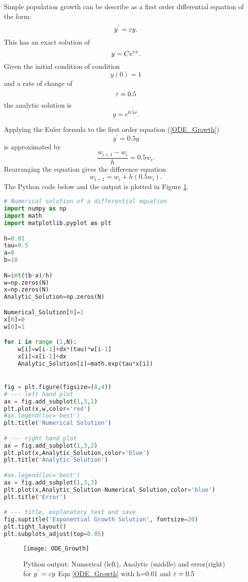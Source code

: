 \begin{example}
Simple population growth can be describe as a first order differential equation of the form: \begin{equation}\label{ODE_Growth} y^{'}=\varepsilon y. \end{equation}
This has an exact solution of 
\[ y=Ce^{\varepsilon x}. \]
Given the initial condition of  condition
\[y(0)=1\]
and a rate of change of
\[ \varepsilon=0.5\]
the analytic solution is
\[ y=e^{0.5x}.\]

\end{example}

\begin{example} Applying the Euler formula to the first order equation
(\ref{ODE_Growth})
\[ y^{'} = 0.5y \]
is approximated by
\[\frac{w_{i+1}-w_i}{h}=0.5w_i. \]
Rearranging the equation gives the difference equation
\[w_{i+1}=w_i+h(0.5w_i). \]
The Python code below and the output is plotted in Figure \ref{GROWTH ODE Figure}.

\begin{lstlisting}[language=Python, caption=Python Numerical and Analytical Solution of Eqn \ref{ODE_Growth} ]
# Numerical solution of a differential equation
import numpy as np
import math 
import matplotlib.pyplot as plt

h=0.01
tau=0.5
a=0
b=10

N=int((b-a)/h)
w=np.zeros(N)
x=np.zeros(N)
Analytic_Solution=np.zeros(N)

Numerical_Solution[0]=1
x[0]=0
w[0]=1

for i in range (1,N):
    w[i]=w[i-1]+dx*(tau)*w[i-1]
    x[i]=x[i-1]+dx
    Analytic_Solution[i]=math.exp(tau*x[i])


fig = plt.figure(figsize=(8,4))
# --- left hand plot
ax = fig.add_subplot(1,3,1)
plt.plot(x,w,color='red')
#ax.legend(loc='best')
plt.title('Numerical Solution')

# --- right hand plot
ax = fig.add_subplot(1,3,2)
plt.plot(x,Analytic_Solution,color='blue')
plt.title('Analytic Solution')

#ax.legend(loc='best')
ax = fig.add_subplot(1,3,3)
plt.plot(x,Analytic_Solution-Numerical_Solution,color='blue')
plt.title('Error')

# --- title, explanatory text and save
fig.suptitle('Exponential Growth Solution', fontsize=20)
plt.tight_layout()
plt.subplots_adjust(top=0.85)
\end{lstlisting}
\end{example}

\begin{figure}[H]
\centering
\texttt{[image: ODE\_Growth]}
\caption{Python output: Numerical (left), Analytic (middle) and error(right) for $y^{'}=\varepsilon y$  Eqn \ref{ODE_Growth} with h=0.01 and $\varepsilon=0.5$}
\label{GROWTH ODE Figure}
\end{figure}

